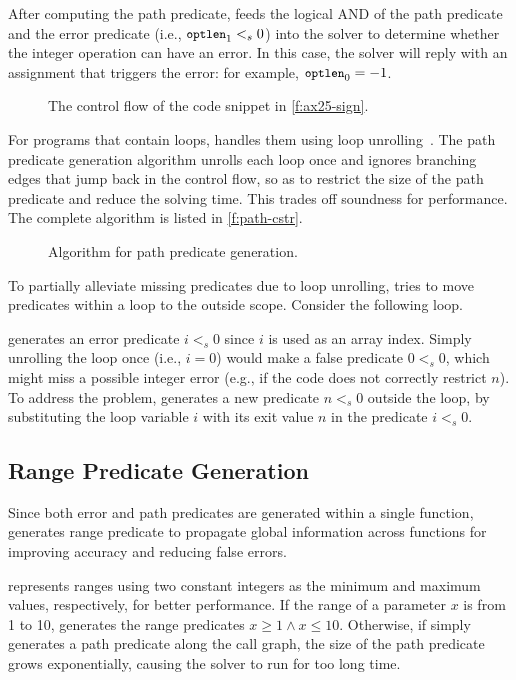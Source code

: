 After computing the path predicate, \sys feeds the logical AND of the
path predicate and the error predicate (i.e., $\cc{optlen}_1 <_s 0$) into
the solver to determine whether the integer operation can have an error.
In this case, the solver will reply with an assignment that triggers
the error: for example, $\cc{optlen}_0 = -1$.

\begin{figure}
\centering
\resizebox{\linewidth}{!}{

}
\caption{The control flow of the code snippet in \autoref{f:ax25-sign}.}
\label{f:cfg}
\end{figure}

For programs that contain loops, \sys handles them using
loop unrolling~\cite{xie:saturn}.  The path
predicate generation algorithm unrolls each loop once and ignores
branching edges that jump back in the control flow,
so as to restrict the size of the path predicate
and reduce the solving time.
This trades off soundness for performance.
The complete algorithm is listed in \autoref{f:path-cstr}.

\begin{figure}

\caption{Algorithm for path predicate generation.}
\label{f:path-cstr}
\end{figure}

To partially alleviate missing predicates due to loop unrolling,
\sys tries to move predicates within a loop to the outside scope.
Consider the following loop.

\sys generates an error predicate $i <_s 0$ since $i$ is used
as an array index.  Simply unrolling the loop once (i.e., $i = 0$)
would make a false predicate $0 <_s 0$, which might miss a possible
integer error (e.g., if the code does not correctly restrict $n$).
To address the problem, \sys generates a new predicate $n <_s 0$
outside the loop, by substituting the loop variable $i$ with its
exit value $n$ in the predicate $i <_s 0$.


\subsection{Range Predicate Generation}
\label{s:gen:range}

Since both error and path predicates are generated within a single
function, \sys generates range predicate to propagate global
information across functions for improving accuracy and reducing
false errors.

\sys represents ranges using two constant integers as the minimum
and maximum values, respectively, for better performance.  If the
range of a parameter $x$ is from 1 to 10, \sys generates the range
predicates $x \geq 1 \land x \leq 10$.
Otherwise, if \sys simply
generates a path predicate along the call graph, the size of the
path predicate grows exponentially, causing the solver to run for
too long time.

